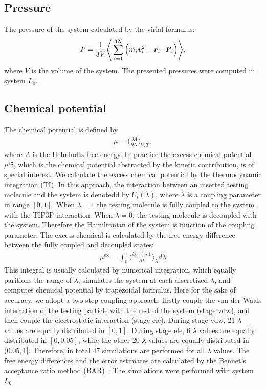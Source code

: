 \documentclass[aip,jcp,a4paper,preprint,unsortedaddress,onecolumn,fleqn]{revtex4-1}
\newcommand{\vect}[1]{\textbf{\textit{#1}}}
\newcommand{\exc}{\textrm{ex}}
\newcommand{\systemla}{L_0}
\begin{document}
\subsection{Pressure}
The pressure of the system calculated by the virial formulus:
\begin{align}
  P = \frac1{3V}
  \Bigg\langle
  \sum_{i=1}^{3N} \Big( m_i\vect v_i^2 + \vect r_i\cdot \vect F_i \Big)
  \Bigg\rangle,
\end{align}
where $V$ is the volume of the system. The presented pressures were computed in system $\systemla$.

\subsection{Chemical potential}

The chemical potential is defined by
\begin{align}
  \mu = \Big(\frac{\partial A}{\partial N}\Big)_{V,T},
\end{align}
where $A$ is the Helmholtz free energy.
In practice the excess chemical potential $\mu^\exc$, which is the
chemical potential abstracted by the kinetic contribution, is of
special interest. We calculate the excess chemical potential by the
thermodynamic integration (TI). In this approach, the interaction
between an inserted testing molecule and the system is
denotedd by $U_t(\lambda)$, where $\lambda$
is a coupling parameter in range $[0,1]$.
When $\lambda = 1$ the testing molecule is fully coupled to the system
with the TIP3P interaction. When $\lambda=0$, the testing molecule
is decoupled with the system.
Therefore the
Hamiltonian of the system is function of the coupling parameter. The
excess chemical is calculated by the free energy difference between
the fully coupled and decoupled states:
\begin{align}
  \mu^\exc = \int_0^1 \Big\langle \frac{\partial U_t(\lambda)}{\partial \lambda} \Big\rangle_\lambda d\lambda
\end{align}
This integral is usually calculated by numerical integration, which
equally paritions the range of $\lambda$, simulates the system at each
discretized $\lambda$, and computes chemical potential by trapezoidal formulus.
Here for the sake of accuracy, 
we adopt a two step coupling approach: firstly couple the van der Waals
interaction of the testing particle with the rest of the system (stage vdw),
and then couple the electrostatic interaction (stage ele).
During stage vdw, 21 $\lambda$ values are equally
distributed in $[0,1]$.  During stage ele, 6 $\lambda$ values are
equally distributed in $[0,0.05]$, while the other 20 $\lambda$ values
are equally distributed in $(0.05, 1]$. Therefore, in total 47
simulations are performed for all $\lambda$ values.
The free energy differences and the error estimates are calculated
by the Bennet's acceptance ratio method (BAR)~\cite{bennett1976efficient}. 
The simulations were performed with system $\systemla$.
\end{document}
